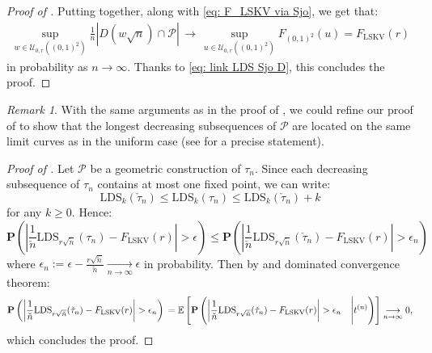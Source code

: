 \documentclass{article}
\theoremstyle{remark}
\newtheorem{rem}{Remark}
\newcommand{\cv}[2]{\underset{#1\to#2}{\longrightarrow}}
\newcommand{\card}[1]{\left|#1\right|}
\newcommand{\mean}[1]{\mathbb{E}\left[#1\right]}
\newcommand{\prob}[1]{\mathbf{P}\left(#1\right)}
\def\LDS{\mathrm{LDS}}
\def\LSKV{\mathrm{LSKV}}
\def\opencarre{(0,1)^2}
\def\pts{\mathcal{P}}
\def\Usjo{\mathcal{U}}
\begin{document}
\begin{proof}[Proof of ]
    \smallskip

    Putting  together, along with \eqref{eq: F_LSKV via Sjo}, we get that:
    \begin{align*}
        \sup_{w\in\Usjo_{0,r}(\opencarre)} \frac1n \card{D(w\sqrt n) \cap \pts}
        \,\longrightarrow\,
        \sup_{u\in\Usjo_{0,r}(\opencarre)} F_{\opencarre}(u)
        = F_\LSKV(r)
    \end{align*}
    in probability as $n\to\infty$.
    Thanks to \eqref{eq: link LDS Sjo D}, this concludes the proof.
\end{proof}


\begin{rem}
    With the same arguments as in the proof of \cite[Lemma~10.1]{S23}, we could refine our proof of  to show that the longest decreasing subsequences of $\pts$ are located on the same limit curves as in the uniform case (see \cite[Theorem~10.2 (a)]{S23} for a precise statement).
\end{rem}

\begin{proof}[Proof of ]
    Let $\pts$ be a geometric construction of $\tau_n$.
    Since each decreasing subsequence of $\tau_n$ contains at most one fixed point, we can write:
    \begin{equation*}
        \LDS_{k}(\check\tau_n)
        \le \LDS_{k}(\tau_n)
        \le \LDS_{k}(\check\tau_n) + k
    \end{equation*}
    for any $k\ge0$.
    Hence:
    \begin{equation*}
        \prob{ \card{\frac{1}{\check n} \LDS_{r\sqrt{\check n}}(\tau_n) - F_\mathrm{LSKV}(r)} > \epsilon }
        \le \prob{ \card{\frac{1}{\check n} \LDS_{r\sqrt{\check n}}(\check\tau_n) - F_\mathrm{LSKV}(r)} > \epsilon_n }
    \end{equation*}
    where $\epsilon_n := \epsilon - \frac{r\sqrt{\check n}}{\check n} \cv{n}{\infty} \epsilon$ in probability.
    Then by  and dominated convergence theorem:
    \begin{equation*}
        \prob{ \card{\frac{1}{\check n} \LDS_{r\sqrt{\check n}}(\check\tau_n) - F_\mathrm{LSKV}(r)} > \epsilon_n }
        \\= \mean{ \prob{ \card{\frac{1}{\check n} \LDS_{r\sqrt{\check n}}(\check\tau_n) - F_\mathrm{LSKV}(r)} > \epsilon_n \quad\Bigg| t^{(n)} }}
        \cv{n}{\infty} 0 ,
    \end{equation*}
    which concludes the proof.
\end{proof}
\end{document}
